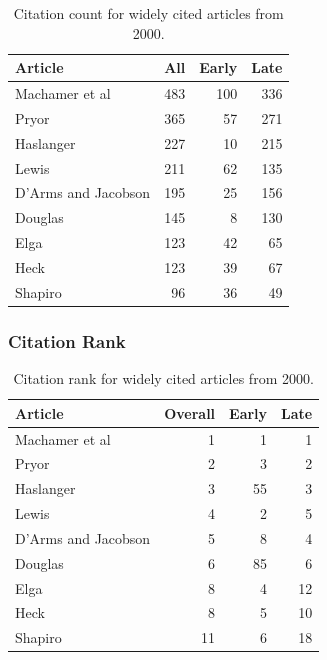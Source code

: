 \documentclass[
  10pt,
  letterpaper,
  DIV=11,
  numbers=noendperiod,
  twoside]{scrartcl}
\begin{document}
\begin{longtable}[]{@{}lrrr@{}}

\caption{\label{tbl-citation-count-2000}Citation count for widely cited
articles from 2000.}

\tabularnewline

\toprule\noalign{}
Article & All & Early & Late \\
\midrule\noalign{}
\endhead
\bottomrule\noalign{}
\endlastfoot
Machamer et al & 483 & 100 & 336 \\
Pryor & 365 & 57 & 271 \\
Haslanger & 227 & 10 & 215 \\
Lewis & 211 & 62 & 135 \\
D'Arms and Jacobson & 195 & 25 & 156 \\
Douglas & 145 & 8 & 130 \\
Elga & 123 & 42 & 65 \\
Heck & 123 & 39 & 67 \\
Shapiro & 96 & 36 & 49 \\

\end{longtable}

\subsubsection*{Citation Rank}\label{sec-rank-2000}

\begin{longtable}[]{@{}lrrr@{}}

\caption{\label{tbl-citation-rank-2000}Citation rank for widely cited
articles from 2000.}

\tabularnewline

\toprule\noalign{}
Article & Overall & Early & Late \\
\midrule\noalign{}
\endhead
\bottomrule\noalign{}
\endlastfoot
Machamer et al & 1 & 1 & 1 \\
Pryor & 2 & 3 & 2 \\
Haslanger & 3 & 55 & 3 \\
Lewis & 4 & 2 & 5 \\
D'Arms and Jacobson & 5 & 8 & 4 \\
Douglas & 6 & 85 & 6 \\
Elga & 8 & 4 & 12 \\
Heck & 8 & 5 & 10 \\
Shapiro & 11 & 6 & 18 \\

\end{longtable}
\end{document}
